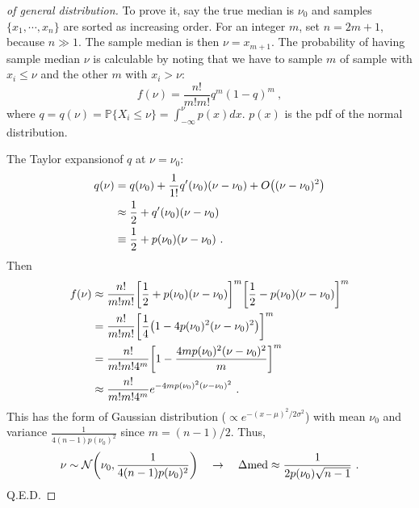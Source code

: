 \begin{proof}[of general distribution]
To prove it, say the true median is $ \nu_0 $ and samples $ \{ x_1, \cdots, x_n \} $ are sorted as increasing order. For an integer $ m $, set $ n = 2m + 1 $, because $ n \gg 1 $. The sample median is then $ \nu = x_{m + 1} $.
The probability of having sample median $ \nu $ is calculable by noting that we have to sample $ m $ of sample with $ x_i \le \nu $ and the other $ m $ with $ x_i > \nu $:
\begin{equation*}
  f(\nu) = \frac{n!}{m! m!} q^m (1 - q)^{m} ~,
\end{equation*}
where $ q = q(\nu) = \mathbb{P} \{ X_i \le \nu \} = \int_{-\infty}^{\nu} p(x) dx $. $ p(x) $ is the pdf of the normal distribution. 

The Taylor expansionof $ q $ at $ \nu = \nu_0 $:
\begin{equation*}
\begin{aligned}
  q(\nu) &= q(\nu_0) + \frac{1}{1!} q'(\nu_0) (\nu - \nu_0) + O\qty( (\nu - \nu_0)^2 )\\
    &\approx \frac{1}{2} + q'(\nu_0) (\nu - \nu_0) \\
    &\equiv \frac{1}{2} + p(\nu_0) (\nu - \nu_0) ~.
\end{aligned}
\end{equation*}
Then 
\begin{equation*}
\begin{aligned}
  f(\nu) &\approx \frac{n!}{m! m!}
    \qty[ \frac{1}{2} + p(\nu_0) (\nu - \nu_0) ]^m
    \qty[ \frac{1}{2} - p(\nu_0) (\nu - \nu_0) ]^m \\
    &= 
    \frac{n!}{m! m!}
    \qty[ \frac{1}{4} \qty( 1 - 4 p(\nu_0)^2 (\nu - \nu_0 )^2) ]^m \\
    &= 
    \frac{n!}{m! m! 4^m}
    \qty[ 1 - \frac{4 m p(\nu_0)^2 (\nu - \nu_0 )^2}{m} ]^m \\
    &\approx 
    \frac{n!}{m! m! 4^m}
    e^{ -4 m p(\nu_0)^2 (\nu - \nu_0 )^2 } ~.
\end{aligned}
\end{equation*}
This has the form of Gaussian distribution ($ \propto e^{-(x - \mu)^2 / 2\sigma^2} $) with mean $ \nu_0 $ and variance $ \frac{1}{4 (n-1) p(\nu_0)^2} $ since $ m = (n - 1) / 2 $. Thus, 
\begin{equation}
  \nu \sim \mathcal{N} \qty( \nu_0, \frac{1}{4 (n-1) p(\nu_0)^2} )
  \quad\rightarrow \quad
  \Delta \mathrm{med} \approx \frac{1}{2 p(\nu_0) \sqrt{n - 1}} ~.
\end{equation}
Q.E.D.
\end{proof}

